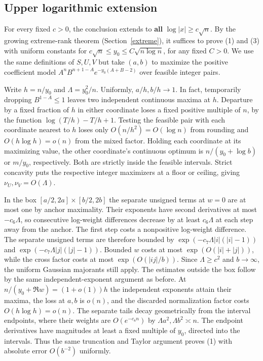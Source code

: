 \documentclass[11pt]{article}
\begin{document}
\subsection{Upper logarithmic extension}

For every fixed $c>0$, the conclusion extends to \textbf{all} $\log|x|\ge c\sqrt n$. By the growing extreme-rank theorem (Section~\ref{extreme}), it suffices to prove (1) and (3) with uniform constants for $c\sqrt n\le y_0\le C\sqrt{n\log n}$, for any fixed $C>0$. We use the same definitions of $S,U,V$ but take $(a,b)$ to maximize the positive coefficient model $A^nB^{n+1-A}e^{-y_0(A+B-2)}$ over feasible integer pairs.

Write $h=n/y_0$ and $\Lambda=y_0^2/n$. Uniformly, $a/h,b/h\to1$. In fact, temporarily dropping $B^{1-A}\le1$ leaves two independent continuous maxima at $h$. Departure by a fixed fraction of $h$ in either coordinate loses a fixed positive multiple of $n$, by the function $\log(T/h)-T/h+1$. Testing the feasible pair with each coordinate nearest to $h$ loses only $O(n/h^2)=O(\log n)$ from rounding and $O(h\log h)=o(n)$ from the mixed factor. Holding each coordinate at its maximizing value, the other coordinate's continuous optimum is $n/(y_0+\log b)$ or $m/y_0$, respectively. Both are strictly inside the feasible intervals. Strict concavity puts the respective integer maximizers at a floor or ceiling, giving $\nu_U,\nu_V=O(\Lambda)$.

In the box $[a/2,2a]\times[b/2,2b]$ the separate unsigned terms at $w=0$ are at most one by anchor maximality. Their exponents have second derivatives at most $-c_6\Lambda$, so consecutive log-weight differences decrease by at least $c_6\Lambda$ at each step away from the anchor. The first step costs a nonpositive log-weight difference. The separate unsigned terms are therefore bounded by $\exp(-c_7\Lambda |i|(|i|-1))$ and $\exp(-c_7\Lambda |j|(|j|-1))$. Bounded $w$ costs at most $\exp(O(|i|+|j|))$, while the cross factor costs at most $\exp(O(|ij|/b))$. Since $\Lambda\ge c^2$ and $b\to\infty$, the uniform Gaussian majorants still apply. The estimates outside the box follow by the same independent-exponent argument as before. At $n/(y_0+\Re w)=(1+o(1))h$ the independent exponents attain their maxima, the loss at $a,b$ is $o(n)$, and the discarded normalization factor costs $O(h\log h)=o(n)$. The separate tails decay geometrically from the interval endpoints, where their weights are $O(e^{-c_8n})$ by $\Lambda a^2,\Lambda b^2\asymp n$. The endpoint derivatives have magnitudes at least a fixed multiple of $y_0$, directed into the intervals. Thus the same truncation and Taylor argument proves (1) with absolute error $O(b^{-2})$ uniformly.
\end{document}
